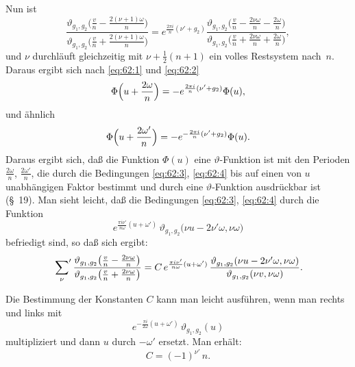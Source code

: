 \documentclass[11pt,a4paper]{article}
\theoremstyle{plain}
\theoremstyle{remark}
\begin{document}
Nun ist
\[
\frac{\vartheta_{g_1,g_2}\bigl(\frac{v}{n}-\frac{2(\nu+1)\omega}{n}\bigr)}
     {\vartheta_{g_1,g_2}\bigl(\frac{v}{n}+\frac{2(\nu+1)\omega}{n}\bigr)}
= e^{\frac{2\pi i}{n}(\nu'+g_2)}
\frac{\vartheta_{g_1,g_2}\bigl(\frac{v}{n}-\frac{2\nu\omega}{n}-\frac{2\omega}{n}\bigr)}
     {\vartheta_{g_1,g_2}\bigl(\frac{v}{n}+\frac{2\nu\omega}{n}+\frac{2\omega}{n}\bigr)},
\]
und $\nu$ durchläuft gleichzeitig mit $\nu+\frac{1}{2}(n+1)$ ein
volles Restsystem nach~$n$. Daraus ergibt sich nach
\eqref{eq:62:1} und \eqref{eq:62:2}
\begin{equation}\label{eq:62:3}
\Phi\Bigl(u+\frac{2\omega}{n}\Bigr)
= -e^{\frac{2\pi i}{n}(\nu'+g_2)}\Phi(u),
\end{equation}
und ähnlich
\begin{equation}\label{eq:62:4}
\Phi\Bigl(u+\frac{2\omega'}{n}\Bigr)
= -e^{-\frac{2\pi i}{n}(\nu'+g_2)}\Phi(u).
\end{equation}
Daraus ergibt sich, daß die Funktion $\Phi(u)$ eine
$\vartheta$-Funktion ist mit den Perioden $\frac{2\omega}{n}$,
$\frac{2\omega'}{n}$, die durch die Bedingungen
\eqref{eq:62:3}, \eqref{eq:62:4} bis auf einen von $u$
unabhängigen Faktor bestimmt und durch eine
$\vartheta$-Funktion ausdrückbar ist (§~19). Man sieht leicht,
daß die Bedingungen \eqref{eq:62:3}, \eqref{eq:62:4} durch die
Funktion
\[
e^{\frac{\pi i\nu'}{n\omega}(u+\omega')}\,
\vartheta_{g_1,g_2}\bigl(\nu u-2\nu'\omega, \nu\omega\bigr)
\]
befriedigt sind, so daß sich ergibt:
\begin{equation}\label{eq:62:5}
\sideset{}{'}\sum_{\nu}
\frac{\vartheta_{g_1,g_2}\bigl(\frac{v}{n}-\frac{2\nu\omega}{n}\bigr)}
     {\vartheta_{g_1,g_2}\bigl(\frac{v}{n}+\frac{2\nu\omega}{n}\bigr)}
= C\,e^{\frac{\pi i\nu'}{n\omega}(u+\omega')}\,
\frac{\vartheta_{g_1,g_2}(\nu u-2\nu'\omega, \nu\omega)}
     {\vartheta_{g_1,g_2}(\nu v, \nu\omega)}.
\end{equation}

Die Bestimmung der Konstanten $C$ kann man leicht ausführen,
wenn man rechts und links mit
\[
e^{-\frac{\pi i}{2\omega}(u+\omega')}\,
\vartheta_{g_1,g_2}(u)
\]
multipliziert und dann $u$ durch $-\omega'$ ersetzt. Man erhält:
\begin{equation}\label{eq:62:6}
C = (-1)^{\nu'}\,n.
\end{equation}
\end{document}
